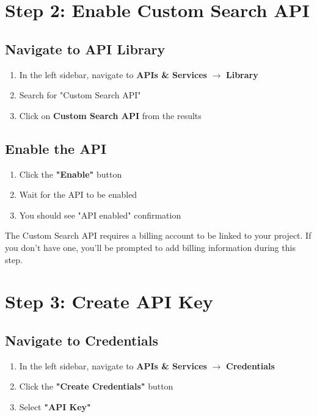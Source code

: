 \documentclass[11pt,a4paper]{article}
\begin{document}
\section{Step 2: Enable Custom Search API}

\subsection{Navigate to API Library}

\begin{enumerate}
    \item In the left sidebar, navigate to \textbf{APIs \& Services} $\rightarrow$ \textbf{Library}
    \item Search for "Custom Search API"
    \item Click on \textbf{Custom Search API} from the results
\end{enumerate}

\subsection{Enable the API}

\begin{enumerate}
    \item Click the \textbf{"Enable"} button
    \item Wait for the API to be enabled
    \item You should see "API enabled" confirmation
\end{enumerate}

\begin{tcolorbox}[colback=alertbg,colframe=googleyellow,title=Billing Requirement]
The Custom Search API requires a billing account to be linked to your project. If you don't have one, you'll be prompted to add billing information during this step.
\end{tcolorbox}

\section{Step 3: Create API Key}

\subsection{Navigate to Credentials}

\begin{enumerate}
    \item In the left sidebar, navigate to \textbf{APIs \& Services} $\rightarrow$ \textbf{Credentials}
    \item Click the \textbf{"Create Credentials"} button
    \item Select \textbf{"API Key"}
\end{enumerate}
\end{document}
